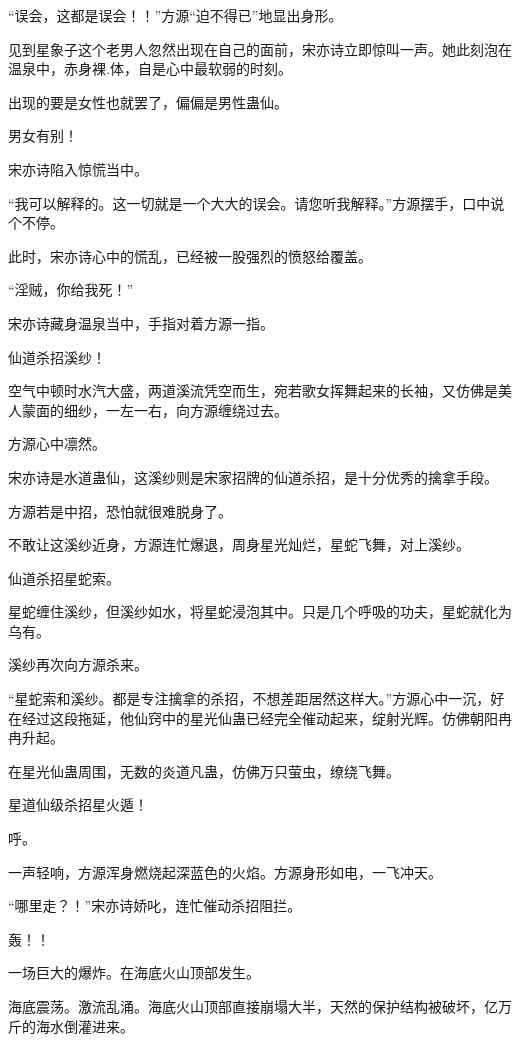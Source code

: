 
\begin{this_body}

“误会，这都是误会！！”方源“迫不得已”地显出身形。

见到星象子这个老男人忽然出现在自己的面前，宋亦诗立即惊叫一声。她此刻泡在温泉中，赤身裸.体，自是心中最软弱的时刻。

出现的要是女性也就罢了，偏偏是男性蛊仙。

男女有别！

宋亦诗陷入惊慌当中。

“我可以解释的。这一切就是一个大大的误会。请您听我解释。”方源摆手，口中说个不停。

此时，宋亦诗心中的慌乱，已经被一股强烈的愤怒给覆盖。

“淫贼，你给我死！”

宋亦诗藏身温泉当中，手指对着方源一指。

仙道杀招溪纱！

空气中顿时水汽大盛，两道溪流凭空而生，宛若歌女挥舞起来的长袖，又仿佛是美人蒙面的细纱，一左一右，向方源缠绕过去。

方源心中凛然。

宋亦诗是水道蛊仙，这溪纱则是宋家招牌的仙道杀招，是十分优秀的擒拿手段。

方源若是中招，恐怕就很难脱身了。

不敢让这溪纱近身，方源连忙爆退，周身星光灿烂，星蛇飞舞，对上溪纱。

仙道杀招星蛇索。

星蛇缠住溪纱，但溪纱如水，将星蛇浸泡其中。只是几个呼吸的功夫，星蛇就化为乌有。

溪纱再次向方源杀来。

“星蛇索和溪纱。都是专注擒拿的杀招，不想差距居然这样大。”方源心中一沉，好在经过这段拖延，他仙窍中的星光仙蛊已经完全催动起来，绽射光辉。仿佛朝阳冉冉升起。

在星光仙蛊周围，无数的炎道凡蛊，仿佛万只萤虫，缭绕飞舞。

星道仙级杀招星火遁！

呼。

一声轻响，方源浑身燃烧起深蓝色的火焰。方源身形如电，一飞冲天。

“哪里走？！”宋亦诗娇叱，连忙催动杀招阻拦。

轰！！

一场巨大的爆炸。在海底火山顶部发生。

海底震荡。激流乱涌。海底火山顶部直接崩塌大半，天然的保护结构被破坏，亿万斤的海水倒灌进来。


\end{this_body}
